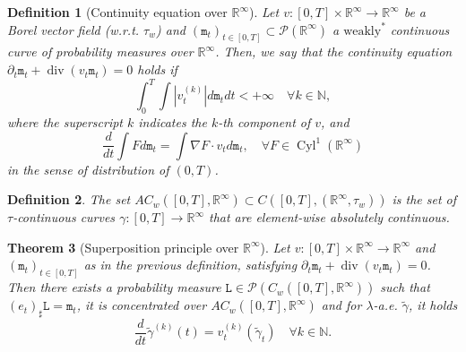 \documentclass[10pt,leqno]{amsart}
\numberwithin{equation}{section}
\newtheorem{teorema}{Theorem}[section]
\newtheorem{df}[teorema]{Definition}
\newcommand{\R}{\mathbb{R}}
\newcommand{\N}{\mathbb{N}}
\newcommand{\PP}{\mathcal{P}}
\begin{document}
\begin{df}[Continuity equation over $\R^\infty$]\label{CE over R^infty}
    Let $v:[0,T]\times \R^\infty \to \R^\infty$ be a Borel vector field (w.r.t. $\tau_w$) and $(\mathtt{m}_t)_{t\in [0,T]} \subset \PP(\R^\infty)$ a $\text{weakly}^*$ continuous curve of probability measures over $\R^\infty$. Then, we say that the continuity equation $\partial_t\mathtt{m}_t + \operatorname{div}(v_t\mathtt{m}_t) = 0$ holds if 
    \begin{equation}
        \int_0^T \int |v_t^{(k)}| d\mathtt{m}_t dt<+\infty \quad \forall k\in \N,
    \end{equation}
    where the superscript $k$ indicates the $k$-th component of $v$, and 
    \begin{equation}
        \frac{d}{dt}\int F d\mathtt{m}_t = \int \nabla F \cdot v_t d\mathtt{m}_t,\quad  \forall F\in \operatorname{Cyl}^1(\R^\infty)
    \end{equation}
    in the sense of distribution of $(0,T)$.
\end{df}

\begin{df}\label{AC_w over R^infty}
    The set $AC_w([0,T],\R^\infty)\subset C([0,T],(\R^\infty,\tau_w))$ is the set of $\tau$-continuous curves $\gamma:[0,T]\to \R^\infty $ that are element-wise absolutely continuous.
\end{df}

\begin{teorema}[Superposition principle over $\R^\infty$]\label{superposition R^infty}
    Let $v:[0,T]\times \R^\infty \to \R^\infty$ and $(\mathtt{m}_t)_{t\in [0,T]}$ as in the previous definition, satisfying $\partial_t\mathtt{m}_t + \operatorname{div}(v_t\mathtt{m}_t) = 0$. Then there exists a probability measure $\mathtt{L} \in \PP(C_w([0,T],\R^\infty))$ such that $(e_t)_\sharp \mathtt{L} = \mathtt{m}_t$, it is concentrated over $AC_w([0,T],\R^\infty) $ and for $\lambda$-a.e. $\tilde\gamma$, it holds
    \begin{equation}
        \frac{d}{dt}\tilde\gamma^{(k)}(t) = v_t^{(k)}(\tilde\gamma_t) \quad \forall k\in \N.
    \end{equation}
\end{teorema}
\end{document}
